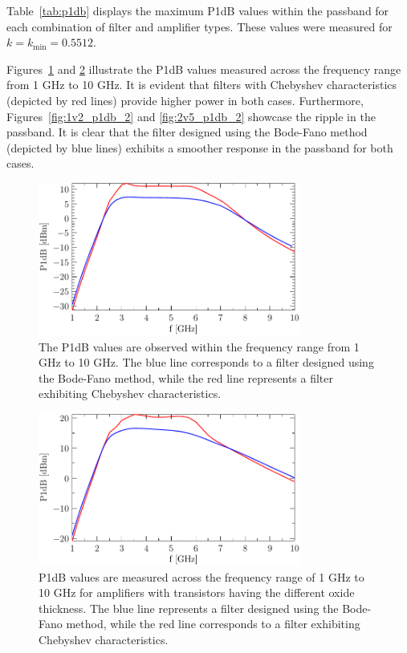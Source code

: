 \documentclass[lettersize,journal]{IEEEtran}
\begin{document}
Table~\ref{tab:p1db} displays the maximum P1dB values within the passband for each combination of filter and amplifier types. These values were measured for $k = k_{\text{min}} = 0.5512$.


Figures~\ref{fig:1v2_p1db_1} and \ref{fig:2v5_p1db_1} illustrate the P1dB values measured across the frequency range from 1 GHz to 10 GHz. It is evident that filters with Chebyshev characteristics (depicted by red lines) provide higher power in both cases. Furthermore, Figures~\ref{fig:1v2_p1db_2} and \ref{fig:2v5_p1db_2} showcase the ripple in the passband. It is clear that the filter designed using the Bode-Fano method (depicted by blue lines) exhibits a smoother response in the passband for both cases.

\begin{figure}[!t]
\centering
\includegraphics[width=3.4in]{./fig/1V2_P1dB_1.pdf}
\caption{The P1dB values are observed within the frequency range from 1 GHz to 10 GHz. The blue line corresponds to a filter designed using the Bode-Fano method, while the red line represents a filter exhibiting Chebyshev characteristics.}
\label{fig:1v2_p1db_1}
\end{figure}

\begin{figure}[!t]
\centering
\includegraphics[width=3.4in]{./fig/2V5_P1dB_1.pdf}
\caption{P1dB values are measured across the frequency range of 1 GHz to 10 GHz for amplifiers with transistors having the different oxide thickness. The blue line represents a filter designed using the Bode-Fano method, while the red line corresponds to a filter exhibiting Chebyshev characteristics.}
\label{fig:2v5_p1db_1}
\end{figure}
 
\end{document}
